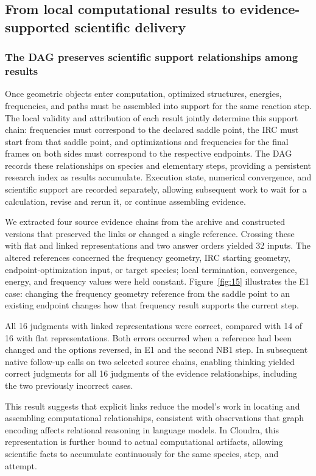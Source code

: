 \subsection{From local computational results to evidence-supported scientific delivery}


\subsubsection{The DAG preserves scientific support relationships among results}

Once geometric objects enter computation, optimized structures, energies, frequencies, and paths must be assembled into support for the same reaction step. The local validity and attribution of each result jointly determine this support chain: frequencies must correspond to the declared saddle point, the IRC must start from that saddle point, and optimizations and frequencies for the final frames on both sides must correspond to the respective endpoints. The DAG records these relationships on species and elementary steps, providing a persistent research index as results accumulate. Execution state, numerical convergence, and scientific support are recorded separately, allowing subsequent work to wait for a calculation, revise and rerun it, or continue assembling evidence.

We extracted four source evidence chains from the archive and constructed versions that preserved the links or changed a single reference. Crossing these with flat and linked representations and two answer orders yielded 32 inputs. The altered references concerned the frequency geometry, IRC starting geometry, endpoint-optimization input, or target species; local termination, convergence, energy, and frequency values were held constant. Figure~\ref{fig:15} illustrates the E1 case: changing the frequency geometry reference from the saddle point to an existing endpoint changes how that frequency result supports the current step.

All 16 judgments with linked representations were correct, compared with 14 of 16 with flat representations. Both errors occurred when a reference had been changed and the options reversed, in E1 and the second NB1 step. In subsequent native follow-up calls on two selected source chains, enabling thinking yielded correct judgments for all 16 judgments of the evidence relationships, including the two previously incorrect cases.

This result suggests that explicit links reduce the model's work in locating and assembling computational relationships, consistent with observations that graph encoding affects relational reasoning in language models.\citep{ref17} In Cloudra, this representation is further bound to actual computational artifacts, allowing scientific facts to accumulate continuously for the same species, step, and attempt.

